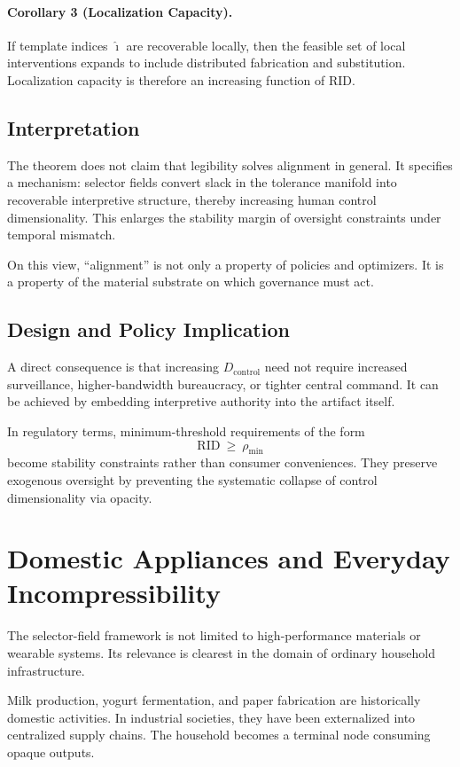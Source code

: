 \documentclass[11pt]{article}
\begin{document}
\paragraph{Corollary 3 (Localization Capacity).}
If template indices $\widehat{\imath}$ are recoverable locally, then the
feasible set of local interventions expands to include distributed
fabrication and substitution. Localization capacity is therefore an
increasing function of RID.

\subsection{Interpretation}

The theorem does not claim that legibility solves alignment in general.
It specifies a mechanism: selector fields convert slack in the tolerance
manifold into recoverable interpretive structure, thereby increasing
human control dimensionality. This enlarges the stability margin of
oversight constraints under temporal mismatch.

On this view, ``alignment'' is not only a property of policies and
optimizers. It is a property of the material substrate on which
governance must act.

\subsection{Design and Policy Implication}

A direct consequence is that increasing $D_{\text{control}}$ need not
require increased surveillance, higher-bandwidth bureaucracy, or tighter
central command. It can be achieved by embedding interpretive authority
into the artifact itself.

In regulatory terms, minimum-threshold requirements of the form
\[
\text{RID}\ \ge\ \rho_{\min}
\]
become stability constraints rather than consumer conveniences.
They preserve exogenous oversight by preventing the systematic collapse
of control dimensionality via opacity.

\section{Domestic Appliances and Everyday Incompressibility}

The selector-field framework is not limited to high-performance
materials or wearable systems. Its relevance is clearest in the
domain of ordinary household infrastructure.

Milk production, yogurt fermentation, and paper fabrication are
historically domestic activities. In industrial societies, they
have been externalized into centralized supply chains. The household
becomes a terminal node consuming opaque outputs.
\end{document}
